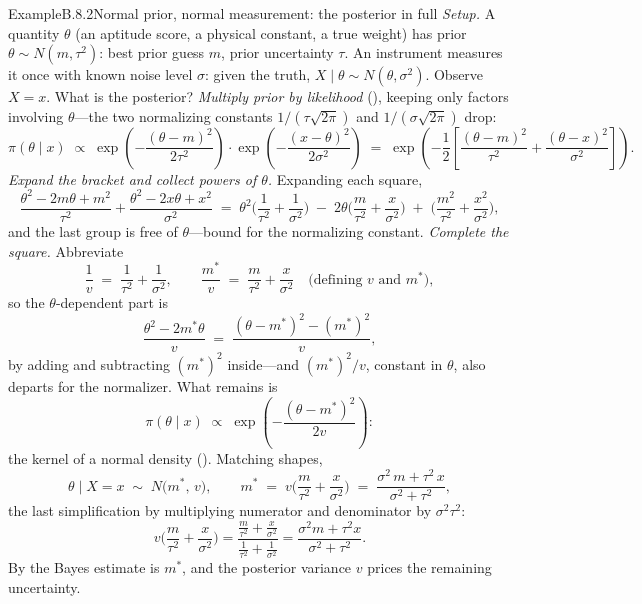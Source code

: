 \documentclass[main.tex]{subfiles}
\begin{document}
\begin{ObjL}{Example}{B.8.2}{Normal prior, normal measurement: the posterior in full}
\emph{Setup.} A quantity $\theta$ (an aptitude score, a physical constant, a true weight)
has prior $\theta\sim N(m,\tau^2)$: best prior guess $m$, prior uncertainty $\tau$. An
instrument measures it once with known noise level $\sigma$: given the truth,
$X\mid\theta\sim N(\theta,\sigma^2)$. Observe $X=x$. What is the posterior?
\emph{Multiply prior by likelihood} (), keeping only factors involving
$\theta$---the two normalizing constants $1/(\tau\sqrt{2\pi})$ and $1/(\sigma\sqrt{2\pi})$
drop:
\[ \pi(\theta\mid x) \;\propto\;
   \exp\!\left( -\frac{(\theta-m)^2}{2\tau^2} \right)\cdot
   \exp\!\left( -\frac{(x-\theta)^2}{2\sigma^2} \right)
   \;=\; \exp\!\left( -\frac12\left[ \frac{(\theta-m)^2}{\tau^2}
   + \frac{(\theta-x)^2}{\sigma^2} \right] \right) . \]
\emph{Expand the bracket and collect powers of $\theta$.} Expanding each square,
\[ \frac{\theta^2 - 2m\theta + m^2}{\tau^2} + \frac{\theta^2 - 2x\theta + x^2}{\sigma^2}
   \;=\; \theta^2\Big( \frac{1}{\tau^2}+\frac{1}{\sigma^2} \Big)
   \;-\; 2\theta\Big( \frac{m}{\tau^2}+\frac{x}{\sigma^2} \Big)
   \;+\; \Big( \frac{m^2}{\tau^2}+\frac{x^2}{\sigma^2} \Big) , \]
and the last group is free of $\theta$---bound for the normalizing constant.
\emph{Complete the square.} Abbreviate
\[ \frac1v \;=\; \frac{1}{\tau^2}+\frac{1}{\sigma^2} , \qquad
   \frac{m^{*}}{v} \;=\; \frac{m}{\tau^2}+\frac{x}{\sigma^2}
   \quad\text{(defining $v$ and $m^*$)} , \]
so the $\theta$-dependent part is
\[ \frac{\theta^2 - 2 m^{*}\theta}{v}
   \;=\; \frac{(\theta - m^{*})^2 - (m^{*})^2}{v} , \]
by adding and subtracting $(m^*)^2$ inside---and $(m^*)^2/v$, constant in $\theta$, also
departs for the normalizer. What remains is
\[ \pi(\theta\mid x) \;\propto\; \exp\!\left( -\frac{(\theta-m^{*})^2}{2v} \right) : \]
the kernel of a normal density (). Matching shapes,
\[ \theta \mid X=x \;\sim\; N\big( m^{*},\, v \big) , \qquad
   m^{*} \;=\; v\Big( \frac{m}{\tau^2}+\frac{x}{\sigma^2} \Big)
   \;=\; \frac{\sigma^2\, m + \tau^2\, x}{\sigma^2+\tau^2} , \]
the last simplification by multiplying numerator and denominator by $\sigma^2\tau^2$:
\[ v\Big(\frac{m}{\tau^2}+\frac{x}{\sigma^2}\Big)
   = \frac{\frac{m}{\tau^2}+\frac{x}{\sigma^2}}{\frac{1}{\tau^2}+\frac{1}{\sigma^2}}
   = \frac{\sigma^2 m + \tau^2 x}{\sigma^2 + \tau^2} . \]
By  the Bayes estimate is $m^{*}$, and the posterior variance $v$ prices the
remaining uncertainty.
\end{ObjL}
\end{document}
